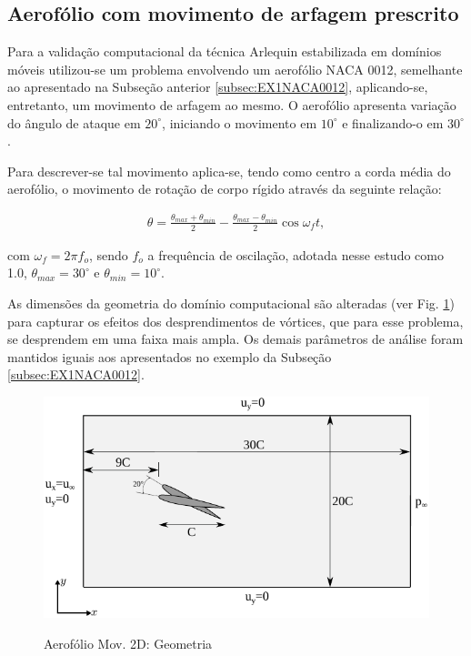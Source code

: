 \documentclass[tese_patricia]{subfiles}
\begin{document}
\subsection{Aerofólio com movimento de arfagem prescrito}


Para a validação computacional da técnica Arlequin estabilizada em domínios móveis  utilizou-se um problema envolvendo um aerofólio NACA 0012, semelhante ao apresentado na Subseção anterior \ref{subsec:EX1NACA0012}, aplicando-se, entretanto, um movimento de arfagem ao mesmo. O aerofólio apresenta variação do ângulo de ataque em $20^{\circ}$, iniciando o movimento em $10^{\circ}$ e finalizando-o em $30^{\circ}$. 

Para descrever-se tal movimento aplica-se, tendo como centro a corda média do aerofólio, o movimento de rotação de corpo rígido através da seguinte relação:

\begin{align}
	\theta = \frac{\theta_{max}+\theta_{min}}{2} - \frac{\theta_{max}-\theta_{min}}{2}\cos{\omega_{f}t} ,
\end{align}

\noindent com $\omega_{f} = 2\pi f_{o}$, sendo $f_{o}$ a frequência de oscilação, adotada nesse estudo como 1.0, $\theta_{max} = 30^{\circ}$ e $\theta_{min} = 10^{\circ}$.

As dimensões da geometria do domínio computacional são alteradas (ver Fig. \ref{fig:AerofolioMoving}) para capturar os efeitos dos desprendimentos de vórtices, que para esse problema, se desprendem em uma faixa mais ampla. Os demais parâmetros de análise foram mantidos iguais aos apresentados no exemplo da Subseção \ref{subsec:EX1NACA0012}. 

\begin{figure}[htb!]
	\centering 
	{\includegraphics[scale=1.0,trim=0cm 0cm 0cm 0cm, clip=true]{Imagens/Cap6/aerofolioMov.pdf}}	
	\caption{Aerofólio Mov. 2D: Geometria}
	\label{fig:AerofolioMoving}
\end{figure}
\end{document}
